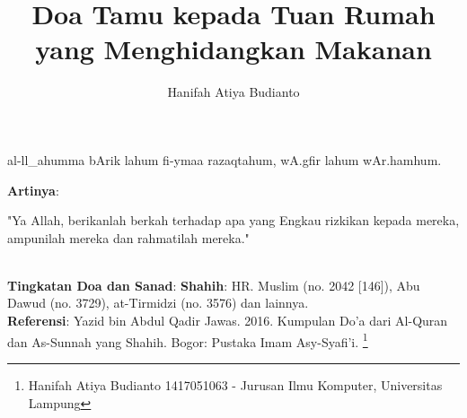 \documentclass[a4paper,12pt]{article}
\title{\Large Doa Tamu kepada Tuan Rumah yang Menghidangkan Makanan}
\author{\calligra Hanifah Atiya Budianto}
\begin{document}
\sffamily
\maketitle 
\fullvocalize
{}
\begin{arabtext}
\noindent
al-ll_ahumma bArik lahum fi-ymaa razaqtahum, wA.gfir lahum wAr.hamhum.\\
\end{arabtext}
\noindent
\textbf{Artinya}:
\par
\indent
"Ya Allah, berikanlah berkah terhadap apa yang Engkau rizkikan kepada 
mereka, ampunilah mereka dan rahmatilah mereka."\\\\
\par
\noindent
\textbf{Tingkatan Doa dan Sanad}: \textbf{Shahih}: HR. Muslim (no. 2042 
[146]), Abu Dawud (no. 3729), at-Tirmidzi (no. 3576) dan lainnya. \\
\textbf{Referensi}: Yazid bin Abdul Qadir Jawas. 2016. Kumpulan Do'a dari
Al-Quran dan As-Sunnah yang Shahih. Bogor: Pustaka Imam Asy-Syafi'i.
\footnote{Hanifah Atiya Budianto 1417051063 - Jurusan Ilmu Komputer,
Universitas Lampung}
\end{document}
